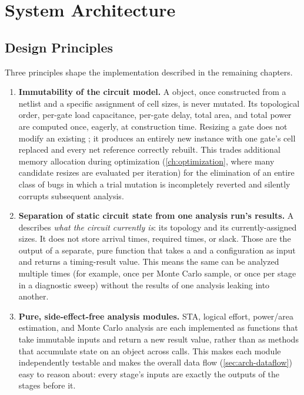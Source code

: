 \chapter{System Architecture}
\label{ch:architecture}

\section{Design Principles}
\label{sec:arch-principles}

Three principles shape the implementation described in the remaining
chapters.

\begin{enumerate}
    \item \textbf{Immutability of the circuit model.} A 
          object, once constructed from a netlist and a specific assignment
          of cell sizes, is never mutated. Its topological order, per-gate
          load capacitance, per-gate delay, total area, and total power are
          computed once, eagerly, at construction time. Resizing a gate does
          not modify an existing ; it produces an entirely new
           instance with one gate's cell replaced and every
          net reference correctly rebuilt. This trades additional memory
          allocation during optimization (\cref{ch:optimization}, where many
          candidate resizes are evaluated per iteration) for the elimination
          of an entire class of bugs in which a trial mutation is
          incompletely reverted and silently corrupts subsequent analysis.
    \item \textbf{Separation of static circuit state from one analysis
          run's results.} A  describes \emph{what the circuit
          currently is}: its topology and its currently-assigned sizes. It
          does not store arrival times, required times, or slack. Those are
          the output of a separate, pure  function
          that takes a  and a configuration as input and
          returns a timing-result value. This means the same
           can be analyzed multiple times (for example, once
          per Monte Carlo sample, or once per stage in a diagnostic sweep)
          without the results of one analysis leaking into another.
    \item \textbf{Pure, side-effect-free analysis modules.} STA, logical
          effort, power/area estimation, and Monte Carlo analysis are each
          implemented as functions that take immutable inputs and return a
          new result value, rather than as methods that accumulate state on
          an object across calls. This makes each module independently
          testable and makes the overall data flow
          (\cref{sec:arch-dataflow}) easy to reason about: every stage's
          inputs are exactly the outputs of the stages before it.
\end{enumerate}

